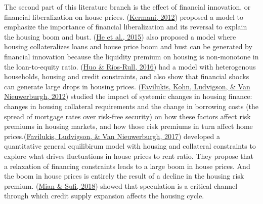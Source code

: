 \documentclass[
  12pt,
]{article}
\begin{document}
The second part of this literature branch is the effect of financial innovation, or financial liberalization on house prices. (\protect\hyperlink{ref-kermani_cheap_2012}{Kermani, 2012}) proposed a model to emphasize the importance of financial liberalization and its reversal to explain the housing boom and bust. (\protect\hyperlink{ref-he_housing_2015}{He et al., 2015}) also proposed a model where housing collateralizes loans and house price boom and bust can be generated by financial innovation because the liquidity premium on housing is non-monotone in the loan-to-equity ratio. (\protect\hyperlink{ref-huo_financial_2016}{Huo \& Ríos-Rull, 2016}) had a model with heterogenous households, housing and credit constraints, and also show that financial shocks can generate large drops in housing prices. (\protect\hyperlink{ref-favilukis_international_2012}{Favilukis, Kohn, Ludvigson, \& Van Nieuwerburgh, 2012}) studied the impact of systemic changes in housing finance: changes in housing collateral requirements and the change in borrowing costs (the spread of mortgage rates over risk-free security) on how these factors affect risk premiums in housing markets, and how those risk premiums in turn affect home prices.(\protect\hyperlink{ref-favilukis_macroeconomic_2017}{Favilukis, Ludvigson, \& Van Nieuwerburgh, 2017}) developed a quantitative general equilibirum model with housing and collateral constraints to explore what drives fluctuations in house prices to rent ratio. They propose that a relaxation of financing constraints leads to a large boom in house prices. And the boom in house prices is entirely the result of a decline in the housing risk premium. (\protect\hyperlink{ref-mian_credit_2018}{Mian \& Sufi, 2018}) showed that speculation is a critical channel through which credit supply expansion affects the housing cycle.
\end{document}
